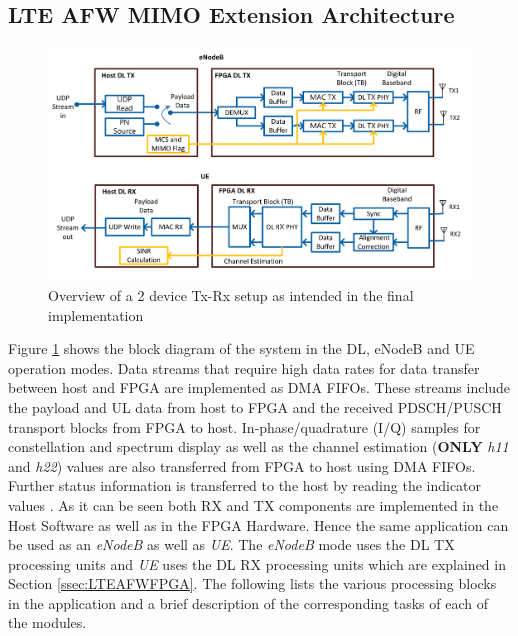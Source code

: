 \subsection{LTE AFW MIMO Extension Architecture}\label{ssec:LTEAFWArch}

\begin{figure}[!htb]
    \centering
    \includegraphics[width=\linewidth]{images/LTEAFW2x2ExtBlockDiagram.png}
    \caption{Overview of a 2 device Tx-Rx setup as intended in the final implementation}
    \label{fig:LTEAFW2DeviceOverview}
\end{figure}

Figure %
\ref{fig:LTEAFW2DeviceOverview} shows the block diagram of the system in the DL, eNodeB and UE operation modes. Data streams that require high data rates for data transfer between host and FPGA are implemented as DMA FIFOs. These streams include the payload and UL data from host to FPGA and the received PDSCH/PUSCH transport blocks from FPGA to host. In-phase/quadrature (I/Q) samples for constellation and spectrum display as well as the channel estimation (\textbf{ONLY} \textit{h11} and \textit{h22}) values are also transferred from FPGA to host using DMA FIFOs. Further status information is transferred to the host by reading the indicator values \cite{LTEAFWManual}. As it can be seen both RX and TX components are implemented in the Host Software as well as in the FPGA Hardware. Hence the same application can be used as an \textit{eNodeB} as well as \textit{UE}. The \textit{eNodeB} mode uses the DL TX processing units and \textit{UE} uses the DL RX processing units which are explained in Section \ref{ssec:LTEAFWFPGA}. The following lists the various processing blocks in the application and a brief description of the corresponding tasks of each of the modules.

